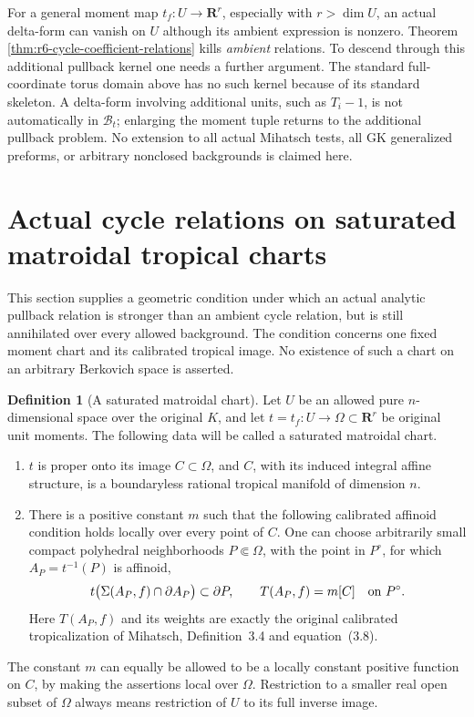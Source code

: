 \documentclass[11pt,a4paper]{article}
\numberwithin{equation}{section}
\theoremstyle{definition}
\newtheorem{definition}[theorem]{Definition}
\theoremstyle{remark}
\begin{document}
For a general moment map $t_f:U\to\mathbf R^r$, especially with
$r>\dim U$, an actual delta-form can vanish on $U$ although its
ambient expression is nonzero.  Theorem
\ref{thm:r6-cycle-coefficient-relations} kills \emph{ambient}
relations.  To descend through this additional pullback kernel
one needs a further argument.  The standard full-coordinate
torus domain above has no such kernel because of its standard
skeleton.  A delta-form involving additional units, such as
$T_i-1$, is not automatically in $\mathscr B_t$; enlarging the
moment tuple returns to the additional pullback problem.
No extension to all actual Mihatsch tests, all GK generalized
preforms, or arbitrary nonclosed backgrounds is claimed here.



\section{Actual cycle relations on saturated matroidal tropical charts}
\label{sec:r6-matroidal-delta-action}

This section supplies a geometric condition under which an actual
analytic pullback relation is stronger than an ambient cycle relation,
but is still annihilated over every allowed background.  The condition
concerns one fixed moment chart and its calibrated tropical image.  No
existence of such a chart on an arbitrary Berkovich space is asserted.

\begin{definition}[A saturated matroidal chart]
\label{def:r6-saturated-matroidal-chart}
Let $U$ be an allowed pure $n$-dimensional space over the original $K$,
and let $t=t_f:U\to\Omega\subset\mathbf R^r$ be original unit moments.
The following data will be called a saturated matroidal chart.
\begin{enumerate}
\item $t$ is proper onto its image $C\subset\Omega$, and $C$, with its
      induced integral affine structure, is a boundaryless rational
      tropical manifold of dimension $n$.
\item There is a positive constant $m$ such that the following calibrated
      affinoid condition holds locally over every point of $C$.
      One can choose arbitrarily small compact polyhedral neighborhoods
      $P\Subset\Omega$, with the point in $P^\circ$, for which
      $A_P=t^{-1}(P)$ is affinoid,
      \[
       t\bigl(\Sigma(A_P,f)\cap\partial A_P\bigr)\subset\partial P,
       \qquad T(A_P,f)=m[C]\quad\hbox{on }P^\circ.
      \]
      Here $T(A_P,f)$ and its weights are exactly the original calibrated
      tropicalization of Mihatsch, Definition~3.4 and equation~(3.8).
\end{enumerate}
The constant $m$ can equally be allowed to be a locally constant positive
function on $C$, by making the assertions local over $\Omega$.
Restriction to a smaller real open subset of $\Omega$ always means
restriction of $U$ to its full inverse image.
\end{definition}
\end{document}
